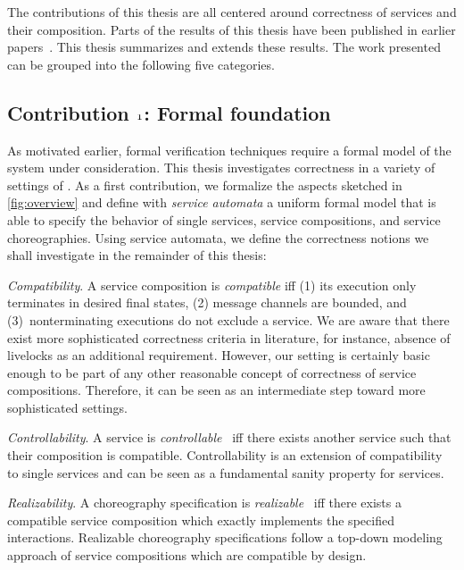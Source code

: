 The contributions of this thesis are all centered around correctness of services and their composition. Parts of the results of this thesis have been published in earlier papers~\cite{LohmannMW_2007_bpm,Lohmann_2008_wsfm,LohmannKLR_2007_wsfm,Lohmann_2008_bpm,LohmannW_2009_wsfm}. This thesis summarizes and extends these results. The work presented can be grouped into the following five categories.




\subsection*{Contribution $\mathnormal{1}$: Formal foundation}

As motivated earlier, formal verification techniques require a formal model of the system under consideration. This thesis investigates correctness in a variety of settings of . As a first contribution, we formalize the aspects sketched in \autoref{fig:overview} and define with \emph{service automata} a uniform formal model that is able to specify the behavior of single services, service compositions, and service choreographies. Using service automata, we define the correctness notions we shall investigate in the remainder of this thesis:

\begin{niceitemize}
\item \emph{Compatibility}. A service composition is \emph{compatible} iff (1) its execution only terminates in desired final states, (2) message channels are bounded, and (3)~nonterminating executions do not exclude a service. We are aware that there exist more sophisticated correctness criteria in literature, for instance, absence of livelocks as an additional requirement. However, our setting is certainly basic enough to be part of any other reasonable concept of correctness of service compositions. Therefore, it can be seen as an intermediate step toward more sophisticated settings.

\item \emph{Controllability}. A service is \emph{controllable}~\cite{Wolf_2008_topnoc} iff there exists another service such that their composition is compatible. Controllability is an extension of compatibility to single services and can be seen as a fundamental sanity property for services.

\item \emph{Realizability}. A choreography specification is \emph{realizable}~\cite{FuBS_2004_tcs,AlurEY_2003_tse} iff there exists a compatible service composition which exactly implements the specified interactions. Realizable choreography specifications follow a top-down modeling approach of service compositions which are compatible by design.
\end{niceitemize}

